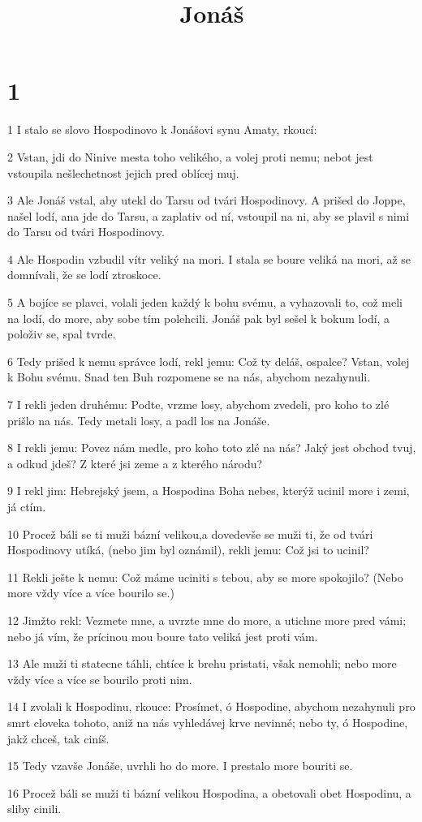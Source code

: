 

\title{Jonáš}

\chapter{1}

\par 1 I stalo se slovo Hospodinovo k Jonášovi synu Amaty, rkoucí:
\par 2 Vstan, jdi do Ninive mesta toho velikého, a volej proti nemu; nebot jest vstoupila nešlechetnost jejich pred oblícej muj.
\par 3 Ale Jonáš vstal, aby utekl do Tarsu od tvári Hospodinovy. A prišed do Joppe, našel lodí, ana jde do Tarsu, a zaplativ od ní, vstoupil na ni, aby se plavil s nimi do Tarsu od tvári Hospodinovy.
\par 4 Ale Hospodin vzbudil vítr veliký na mori. I stala se boure veliká na mori, až se domnívali, že se lodí ztroskoce.
\par 5 A bojíce se plavci, volali jeden každý k bohu svému, a vyhazovali to, což meli na lodí, do more, aby sobe tím polehcili. Jonáš pak byl sešel k bokum lodí, a položiv se, spal tvrde.
\par 6 Tedy prišed k nemu správce lodí, rekl jemu: Což ty deláš, ospalce? Vstan, volej k Bohu svému. Snad ten Buh rozpomene se na nás, abychom nezahynuli.
\par 7 I rekli jeden druhému: Podte, vrzme losy, abychom zvedeli, pro koho to zlé prišlo na nás. Tedy metali losy, a padl los na Jonáše.
\par 8 I rekli jemu: Povez nám medle, pro koho toto zlé na nás? Jaký jest obchod tvuj, a odkud jdeš? Z které jsi zeme a z kterého národu?
\par 9 I rekl jim: Hebrejský jsem, a Hospodina Boha nebes, kterýž ucinil more i zemi, já ctím.
\par 10 Procež báli se ti muži bázní velikou,a dovedevše se muži ti, že od tvári Hospodinovy utíká, (nebo jim byl oznámil), rekli jemu: Což jsi to ucinil?
\par 11 Rekli ješte k nemu: Což máme uciniti s tebou, aby se more spokojilo? (Nebo more vždy více a více bourilo se.)
\par 12 Jimžto rekl: Vezmete mne, a uvrzte mne do more, a utichne more pred vámi; nebo já vím, že prícinou mou boure tato veliká jest proti vám.
\par 13 Ale muži ti statecne táhli, chtíce k brehu pristati, však nemohli; nebo more vždy více a více se bourilo proti nim.
\par 14 I zvolali k Hospodinu, rkouce: Prosímet, ó Hospodine, abychom nezahynuli pro smrt cloveka tohoto, aniž na nás vyhledávej krve nevinné; nebo ty, ó Hospodine, jakž chceš, tak ciníš.
\par 15 Tedy vzavše Jonáše, uvrhli ho do more. I prestalo more bouriti se.
\par 16 Procež báli se muži ti bázní velikou Hospodina, a obetovali obet Hospodinu, a sliby cinili.

